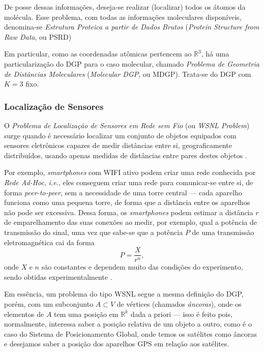 \documentclass[a4paper,12pt]{article}
\begin{document}
De posse dessas informações, deseja-se realizar (localizar) todos os átomos da molécula. Esse problema, com todas as informações moleculares disponíveis, denomina-se \textit{Estrutura Proteica a partir de Dados Brutos} (\textit{Protein Structure from Raw Data}, ou PSRD)

Em particular, como as coordenadas atômicas pertencem ao $\mathbb{R}^3$, há uma particularização do DGP para o caso molecular, chamado \textit{Problema de Geometria de Distâncias Moleculares} (\textit{Molecular DGP}, ou MDGP). Trata-se do DGP com $K = 3$ fixo.

\subsubsection{Localização de Sensores}

O \textit{Problema de Localização de Sensores em Rede sem Fio} (ou \textit{WSNL Problem}) surge quando é necessário localizar um conjunto de objetos equipados com sensores eletrônicos capazes de medir distâncias entre si, geograficamente distribuídos, usando apenas medidas de distâncias entre pares destes objetos \cite{yemini1978positioning}. 

Por exemplo, \textit{smartphones} com WIFI ativo podem criar uma rede conhecida por \textit{Rede Ad-Hoc}, \textit{i.e.}, eles conseguem criar uma rede para comunicar-se entre si, de forma \textit{peer-to-peer}, sem a necessidade de uma torre central --- cada aparelho funciona como uma pequena torre, de forma que a distância entre os aparelhos não pode ser excessiva.
Dessa forma, os \textit{smartphones} podem estimar a distância $r$ de emparelhamento das suas conexões ao medir, por exemplo, qual a potência de transmissão do sinal, uma vez que sabe-se que a potência $P$ de uma transmissão eletromagnética cai da forma 
\begin{equation}
	P = \frac{X}{r^n},
\end{equation}
onde $X$ e $n$ são constantes e dependem muito das condições do experimento, sendo obtidas experimentalmente \cite{savvides2001dynamic}.

Em essência, um problema do tipo WSNL segue a mesma definição do DGP, porém, com um subconjunto $A\subset V$ de vértices (chamados \textit{âncoras}), onde os elementos de $A$ tem uma posição em $\mathbb{R}^k$ dada a priori --- isso é feito pois, normalmente, interessa saber a posição relativa de um objeto a outro, como é o caso do Sistema de Posicionamento Global, onde temos os satélites como âncoras e desejamos saber a posição dos aparelhos GPS em relação aos satélites.
\end{document}
